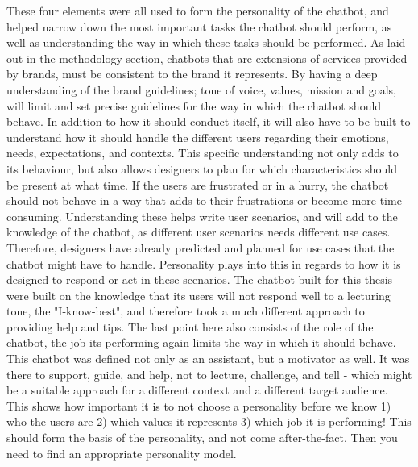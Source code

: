 These four elements were all used to form the personality of the chatbot, and helped narrow down the most important tasks the chatbot should perform, as well as understanding the way in which these tasks should be performed. As laid out in the methodology section, chatbots that are extensions of services provided by brands, must be consistent to the brand it represents. By having a deep understanding of the brand guidelines; tone of voice, values, mission and goals, will limit and set precise guidelines for the way in which the chatbot should behave. In addition to how it should conduct itself, it will also have to be built to understand how it should handle the different users regarding their emotions, needs, expectations, and contexts. This specific understanding not only adds to its behaviour, but also allows designers to plan for which characteristics should be present at what time. If the users are frustrated or in a hurry, the chatbot should not behave in a way that adds to their frustrations or become more time consuming. Understanding these helps write user scenarios, and will add to the knowledge of the chatbot, as different user scenarios needs different use cases. Therefore, designers have already predicted and planned for use cases that the chatbot might have to handle. Personality plays into this in regards to how it is designed to respond or act in these scenarios. The chatbot built for this thesis were built on the knowledge that its users will not respond well to a lecturing tone, the "I-know-best", and therefore took a much different approach to providing help and tips. The last point here also consists of the role of the chatbot, the job its performing again limits the way in which it should behave. This chatbot was defined not only as an assistant, but a motivator as well. It was there to support, guide, and help, not to lecture, challenge, and tell - which might be a suitable approach for a different context and a different target audience. This shows how important it is to not choose a personality before we know 1) who the users are 2) which values it represents 3) which job it is performing! This should form the basis of the personality, and not come after-the-fact. Then you need to find an appropriate personality model. 

